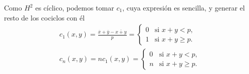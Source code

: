 \begin{ejercicio}
\begin{solucion}
		Como $H^2$ es cíclico, podemos tomar $c_1$, cuya expresión es sencilla, y generar el resto de los cociclos con él
		\begin{gather*}
		    c_1(x,y) = \frac{\overline{x} + \overline{y} - \overline{x+y}}{p} =  \begin{cases}
		        0 & \text{si } x+y < p,\\
		        1 & \text{si } x+y \geq p.
		        \end{cases} \\
		    c_n(x,y) = nc_1(x,y) =  \begin{cases}
		        0 & \text{si } x+y < p,\\
		        n & \text{si } x+y \geq p.
		        \end{cases}
		\end{gather*}
	\end{solucion}
\end{ejercicio}
